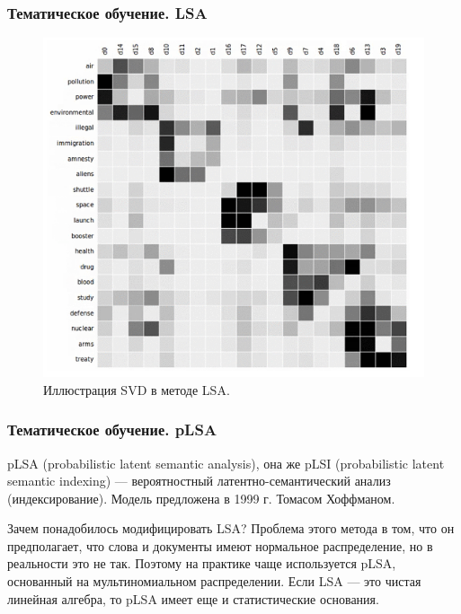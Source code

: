 \documentclass[ucs, notheorems, handout]{beamer}
\begin{document}
			\begin{frame}
	\frametitle{Тематическое обучение. LSA}
	

\begin{figure}[H]
	\begin{center}
		\includegraphics[scale = 0.4]{LSA2.png}
		\caption{Иллюстрация SVD в методе LSA.}
	\end{center}
\end{figure}

	\end{frame}
		\begin{frame}
	\frametitle{Тематическое обучение. pLSA}
	

pLSA (probabilistic latent semantic analysis), она же pLSI (probabilistic latent semantic indexing) --- вероятностный латентно-семантический анализ (индексирование). Модель предложена в 1999 г. Томасом Хоффманом.

Зачем понадобилось модифицировать LSA? Проблема этого метода в том, что он предполагает, что слова и документы имеют нормальное распределение, но в реальности это не так. Поэтому на практике чаще используется pLSA, основанный на мультиномиальном распределении. Если LSA — это чистая линейная алгебра, то pLSA имеет еще и статистические основания.

	\end{frame}
	
\end{document}
